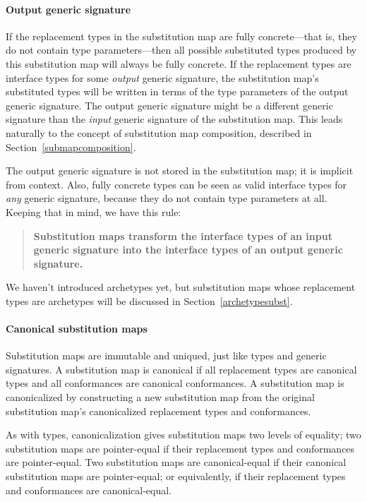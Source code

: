 \documentclass[a4paper,headsepline,bibliography=totoc,toc=flat,fleqn,twoside=semi]{scrbook}
\theoremstyle{definition}
\theoremstyle{definition}
\theoremstyle{definition}
\begin{document}
\paragraph{Output generic signature}
If the replacement types in the substitution map are fully concrete---that is, they do not contain type parameters---then all possible substituted types produced by this substitution map will always be fully concrete. If the replacement types are interface types for some \emph{output} generic signature, the substitution map's substituted types will be written in terms of the type parameters of the output generic signature. The output generic signature might be a different generic signature than the \emph{input} generic signature of the substitution map. This leads naturally to the concept of substitution map composition, described in Section~\ref{submapcomposition}.

The output generic signature is not stored in the substitution map; it is implicit from context. Also, fully concrete types can be seen as valid interface types for \emph{any} generic signature, because they do not contain type parameters at all. Keeping that in mind, we have this rule:
\begin{quote}
\textbf{Substitution maps transform the interface types of an input generic signature into the interface types of an output generic signature.}
\end{quote}
We haven't introduced archetypes yet, but substitution maps whose replacement types are archetypes will be discussed in Section~\ref{archetypesubst}.

\paragraph{Canonical substitution maps}
Substitution maps are immutable and uniqued, just like types and generic signatures. A substitution map is canonical if all replacement types are canonical types and all conformances are canonical conformances. A substitution map is canonicalized by constructing a new substitution map from the original substitution map's canonicalized replacement types and conformances.

As with types, canonicalization gives substitution maps two levels of equality; two substitution maps are pointer-equal if their replacement types and conformances are pointer-equal. Two substitution maps are canonical-equal if their canonical substitution maps are pointer-equal; or equivalently, if their replacement types and conformances are canonical-equal.
\end{document}
